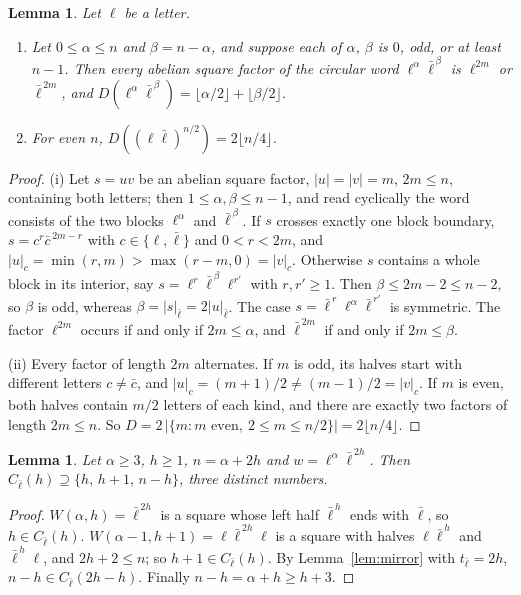 \documentclass[11pt,reqno]{amsart}
\newtheorem{lemma}[theorem]{Lemma}
\theoremstyle{definition}
\newcommand{\lb}{\bar\ell}
\newcommand{\fl}[1]{\lfloor #1\rfloor}
\begin{document}
\begin{lemma}\label{lem:upper}
Let $\ell$ be a letter.
\begin{enumerate}
\item[(i)] Let $0\le\alpha\le n$ and $\beta=n-\alpha$, and suppose each of $\alpha$, $\beta$ is $0$, odd, or at least $n-1$. Then every abelian square factor of the circular word $\ell^\alpha\lb^{\,\beta}$ is $\ell^{2m}$ or $\lb^{\,2m}$, and $D(\ell^\alpha\lb^{\,\beta})=\fl{\alpha/2}+\fl{\beta/2}$.
\item[(ii)] For even $n$, $D((\ell\lb)^{n/2})=2\fl{n/4}$.
\end{enumerate}
\end{lemma}

\begin{proof}
(i) Let $s=uv$ be an abelian square factor, $|u|=|v|=m$, $2m\le n$, containing both letters; then $1\le\alpha,\beta\le n-1$, and read cyclically the word consists of the two blocks $\ell^\alpha$ and $\lb^{\,\beta}$. If $s$ crosses exactly one block boundary, $s=c^r\bar c^{\,2m-r}$ with $c\in\{\ell,\lb\}$ and $0<r<2m$, and $|u|_c=\min(r,m)>\max(r-m,0)=|v|_c$. Otherwise $s$ contains a whole block in its interior, say $s=\ell^r\lb^{\,\beta}\ell^{r'}$ with $r,r'\ge 1$. Then $\beta\le 2m-2\le n-2$, so $\beta$ is odd, whereas $\beta=|s|_{\lb}=2|u|_{\lb}$. The case $s=\lb^{\,r}\ell^\alpha\lb^{\,r'}$ is symmetric. The factor $\ell^{2m}$ occurs if and only if $2m\le\alpha$, and $\lb^{\,2m}$ if and only if $2m\le\beta$.

(ii) Every factor of length $2m$ alternates. If $m$ is odd, its halves start with different letters $c\ne\bar c$, and $|u|_c=(m+1)/2\ne(m-1)/2=|v|_c$. If $m$ is even, both halves contain $m/2$ letters of each kind, and there are exactly two factors of length $2m\le n$. So $D=2\,|\{m: m\text{ even},\ 2\le m\le n/2\}|=2\fl{n/4}$.
\end{proof}

\begin{lemma}\label{lem:fat}
Let $\alpha\ge 3$, $h\ge 1$, $n=\alpha+2h$ and $w=\ell^\alpha\lb^{\,2h}$. Then $C_{\lb}(h)\supseteq\{h,\,h+1,\,n-h\}$, three distinct numbers.
\end{lemma}

\begin{proof}
$W(\alpha,h)=\lb^{\,2h}$ is a square whose left half $\lb^{\,h}$ ends with $\lb$, so $h\in C_{\lb}(h)$. $W(\alpha-1,h+1)=\ell\lb^{\,2h}\ell$ is a square with halves $\ell\lb^{\,h}$ and $\lb^{\,h}\ell$, and $2h+2\le n$; so $h+1\in C_{\lb}(h)$. By Lemma~\ref{lem:mirror} with $t_{\lb}=2h$, $n-h\in C_{\lb}(2h-h)$. Finally $n-h=\alpha+h\ge h+3$.
\end{proof}
\end{document}
